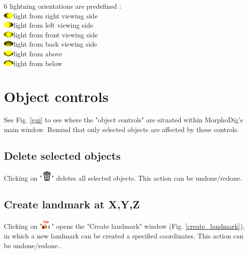 6 lightning orientations are predefined :\\
\includegraphics[scale=0.7]{images/06/light/light_right.png}light from right viewing side\\
\includegraphics[scale=0.7]{images/06/light/light_left.png}light from left viewing side\\
\includegraphics[scale=0.7]{images/06/light/light_front.png}light from front viewing side\\
\includegraphics[scale=0.7]{images/06/light/light_back.png}light from back viewing side\\
\includegraphics[scale=0.7]{images/06/light/light_above.png}light from above\\
\includegraphics[scale=0.7]{images/06/light/light_below.png}light from below\\




  \section{Object controls}
See Fig. \ref{gui} to see where the "object controls" are situated within MorphoDig's main window. Remind that only selected objects are affected by these controls.

\subsection{Delete selected objects}
Clicking on "\includegraphics[scale=0.7]{images/06/objects/delete2.png}" deletes all selected objects. This action can be undone/redone.

\subsection{Create landmark at X,Y,Z}
Clicking on "\includegraphics[scale=0.7]{images/06/objects/landmark_xyz.png}" opens the "Create landmark" window  (Fig. \ref{create_landmark}), in which a new landmark can be created a specified coordinates. This action can be undone/redone..

